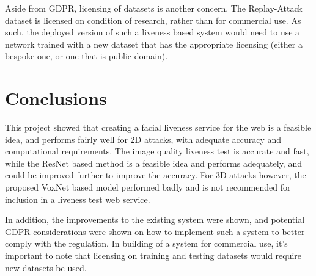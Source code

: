 \documentclass[11pt,a4paper]{article}
\begin{document}
            Aside from GDPR, licensing of datasets is another concern. The Replay-Attack dataset is licensed on condition of research, rather than for commercial use. 
            As such, the deployed version of such a liveness based system would need to use a network trained with a new dataset that has the appropriate licensing (either a bespoke one, or one that is public domain).

\section{Conclusions}
    This project showed that creating a facial liveness service for the web is a feasible idea, and performs fairly well for 2D attacks, with adequate accuracy and computational requirements.
    The image quality liveness test is accurate and fast, while the ResNet based method is a feasible idea and performs adequately, and could be improved further to improve the accuracy. For 3D attacks however, the
    proposed VoxNet based model performed badly and is not recommended for inclusion in a liveness test web service.

    In addition, the improvements to the existing system were shown, and potential GDPR considerations were shown on how to implement such a system to better comply with the regulation. In building of a system for commercial use, it's important
    to note that licensing on training and testing datasets would require new datasets be used.

\printglossary


\end{document}
